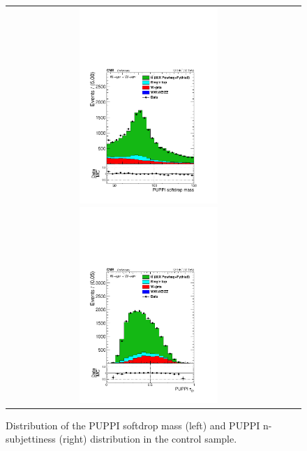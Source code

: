 \begin{figure}[h!]
\centering
\begin{tabular}{cc}
\includegraphics[width=0.5\textwidth]{figures/vtagging/AN-16-342/controlplots/Whadr_puppi_softdrop_powheg.pdf}
\includegraphics[width=0.5\textwidth]{figures/vtagging/AN-16-342/controlplots/Whadr_puppi_tau2tau1_powheg.pdf}\\
\end{tabular}
\caption{Distribution of the PUPPI softdrop mass (left) and PUPPI n-subjettiness (right) distribution in the \ttbar control sample.}
\label{fig:searchII:ttbarcp}
\end{figure}

